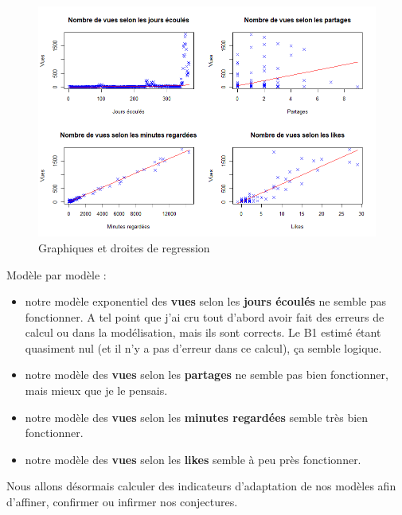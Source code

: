 \begin{Schunk}
\begin{figure}[htbp]

{\centering \includegraphics[width=6in]{graphiquesDroitesDeRegression} 

}

\caption[Graphiques et droites de regression]{Graphiques et droites de regression}\label{fig:newGraphs}
\end{figure}
\end{Schunk}

Modèle par modèle :

\begin{itemize}
\tightlist
\item
  notre modèle exponentiel des \textbf{vues} selon les \textbf{jours
  écoulés} ne semble pas fonctionner. A tel point que j'ai cru tout
  d'abord avoir fait des erreurs de calcul ou dans la modélisation, mais
  ils sont corrects. Le B1 estimé étant quasiment nul (et il n'y a pas
  d'erreur dans ce calcul), ça semble logique.
\item
  notre modèle des \textbf{vues} selon les \textbf{partages} ne semble
  pas bien fonctionner, mais mieux que je le pensais.
\item
  notre modèle des \textbf{vues} selon les \textbf{minutes regardées}
  semble très bien fonctionner.
\item
  notre modèle des \textbf{vues} selon les \textbf{likes} semble à peu
  près fonctionner.
\end{itemize}

Nous allons désormais calculer des indicateurs d'adaptation de nos
modèles afin d'affiner, confirmer ou infirmer nos conjectures.


